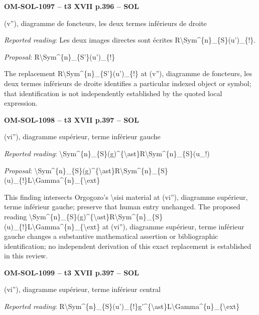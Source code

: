 \par\noindent\textbf{OM-SOL-1097 -- t3 XVII p.396 -- SOL}\par
(v''), diagramme de foncteurs, les deux termes inférieurs de droite\par
\emph{Reported reading}: Les deux images directes sont écrites R\textbackslash{}Sym\textasciicircum{}\{n\}\_\{S\}(u')\_\{!\}.\par
\emph{Proposal}: R\textbackslash{}Sym\textasciicircum{}\{n\}\_\{S'\}(u')\_\{!\}\par
The replacement R\textbackslash{}Sym\textasciicircum{}\{n\}\_\{S'\}(u')\_\{!\} at (v''), diagramme de foncteurs, les deux termes inférieurs de droite identifies a particular indexed object or symbol; that identification is not independently established by the quoted local expression.\par
\par\noindent\textbf{OM-SOL-1098 -- t3 XVII p.397 -- SOL}\par
(vi''), diagramme supérieur, terme inférieur gauche\par
\emph{Reported reading}: \textbackslash{}Sym\textasciicircum{}\{n\}\_\{S\}(g)\textasciicircum{}\{\textbackslash{}ast\}R\textbackslash{}Sym\textasciicircum{}\{n\}\_\{S\}(u\_!)\par
\emph{Proposal}: \textbackslash{}Sym\textasciicircum{}\{n\}\_\{S\}(g)\textasciicircum{}\{\textbackslash{}ast\}R\textbackslash{}Sym\textasciicircum{}\{n\}\_\{S\}(u)\_\{!\}L\textbackslash{}Gamma\textasciicircum{}\{n\}\_\{\textbackslash{}ext\}\par
This finding intersects Orgogozo's \textbackslash{}sisi material at (vi''), diagramme supérieur, terme inférieur gauche; preserve that human entry unchanged. The proposed reading \textbackslash{}Sym\textasciicircum{}\{n\}\_\{S\}(g)\textasciicircum{}\{\textbackslash{}ast\}R\textbackslash{}Sym\textasciicircum{}\{n\}\_\{S\}(u)\_\{!\}L\textbackslash{}Gamma\textasciicircum{}\{n\}\_\{\textbackslash{}ext\} at (vi''), diagramme supérieur, terme inférieur gauche changes a substantive mathematical assertion or bibliographic identification; no independent derivation of this exact replacement is established in this review.\par
\par\noindent\textbf{OM-SOL-1099 -- t3 XVII p.397 -- SOL}\par
(vi''), diagramme supérieur, terme inférieur central\par
\emph{Reported reading}: R\textbackslash{}Sym\textasciicircum{}\{n\}\_\{S\}(u')\_\{!\}g'\textasciicircum{}\{\textbackslash{}ast\}L\textbackslash{}Gamma\textasciicircum{}\{n\}\_\{\textbackslash{}ext\}\par

